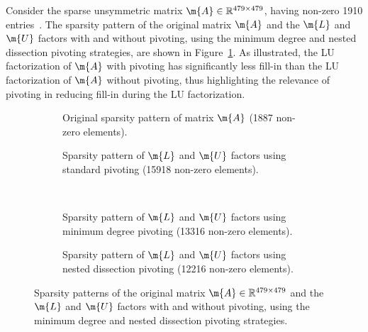 \begin{example}
  Consider the  sparse unsymmetric matrix $\m{A} \in \mathbb{R}^{479 \times 479}$, having non-zero 1910 entries~\cite{matlab}. The sparsity pattern of the original matrix $\m{A}$ and the $\m{L}$ and $\m{U}$ factors with and without pivoting, using the minimum degree and nested dissection pivoting strategies, are shown in Figure~\ref{chap3:fig:sparsity_patterns}. As illustrated, the \ac{LU} factorization of $\m{A}$ with pivoting has significantly less fill-in than the \ac{LU} factorization of $\m{A}$ without pivoting, thus highlighting the relevance of pivoting in reducing fill-in during the \ac{LU} factorization.
  \begin{figure}[htb] %
    \centering
    \begin{subfigure}[t]{0.45\textwidth}
      \centering
      \small{}
      \caption{Original sparsity pattern of matrix $\m{A}$ (1887 non-zero elements).}
    \end{subfigure}%
    \hfill%
    \begin{subfigure}[t]{0.45\textwidth}
      \centering
      \small{}
      \caption{Sparsity pattern of $\m{L}$ and $\m{U}$ factors using standard pivoting (15918 non-zero elements).}
    \end{subfigure} \\[1.0em]
    \begin{subfigure}[t]{0.45\textwidth}
      \centering
      \small{}
      \caption{Sparsity pattern of $\m{L}$ and $\m{U}$ factors using minimum degree pivoting (13316 non-zero elements).}
    \end{subfigure}%
    \hfill%
    \begin{subfigure}[t]{0.45\textwidth}
      \centering
      \small{}
      \caption{Sparsity pattern of $\m{L}$ and $\m{U}$ factors using nested dissection pivoting (12216 non-zero elements).}
    \end{subfigure}
    \caption{Sparsity patterns of the original  matrix $\m{A} \in \mathbb{R}^{479 \times 479}$ and the $\m{L}$ and $\m{U}$ factors with and without pivoting, using the minimum degree and nested dissection pivoting strategies.}
    \label{chap3:fig:sparsity_patterns}
  \end{figure}
\end{example}

